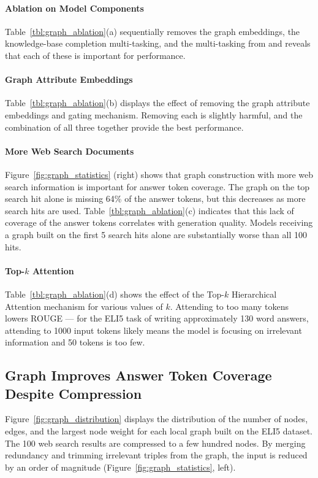 \documentclass[11pt,a4paper]{article}
\begin{document}
\paragraph{Ablation on Model Components} Table~\ref{tbl:graph_ablation}(a) sequentially removes the graph embeddings, the knowledge-base completion multi-tasking, and the multi-tasking from \cite{fan2019explain} and reveals that each of these is important for performance. 

\paragraph{Graph Attribute Embeddings} Table~\ref{tbl:graph_ablation}(b) displays the effect of removing the graph attribute embeddings and gating mechanism. Removing each is slightly harmful, and the combination of all three together provide the best performance. 

\paragraph{More Web Search Documents} Figure~\ref{fig:graph_statistics} (right) shows that graph construction with more web search information is important for answer token coverage. The graph on the top search hit alone is missing 64\% of the answer tokens, but this decreases as more search hits are used.  Table~\ref{tbl:graph_ablation}(c) indicates that this lack of coverage of the answer tokens correlates with generation quality. Models receiving a graph built on the first 5 search hits alone are substantially worse than all 100  hits.

\paragraph{Top-$k$ Attention} Table~\ref{tbl:graph_ablation}(d) shows the effect of the Top-$k$ Hierarchical Attention mechanism for various values of $k$. Attending to too many tokens lowers ROUGE --- for the ELI5 task of writing approximately 130 word answers, attending to 1000 input tokens likely means the model is focusing on irrelevant information and 50 tokens is too few.

\subsection{Graph Improves Answer Token Coverage Despite Compression}

Figure~\ref{fig:graph_distribution} displays the distribution of the number of nodes, edges, and the largest node weight for each local graph built on the ELI5 dataset. The 100 web search results are compressed to a few hundred nodes. By merging redundancy and trimming irrelevant triples from the graph, the input is reduced by an order of magnitude (Figure~\ref{fig:graph_statistics}, left). 
\end{document}
